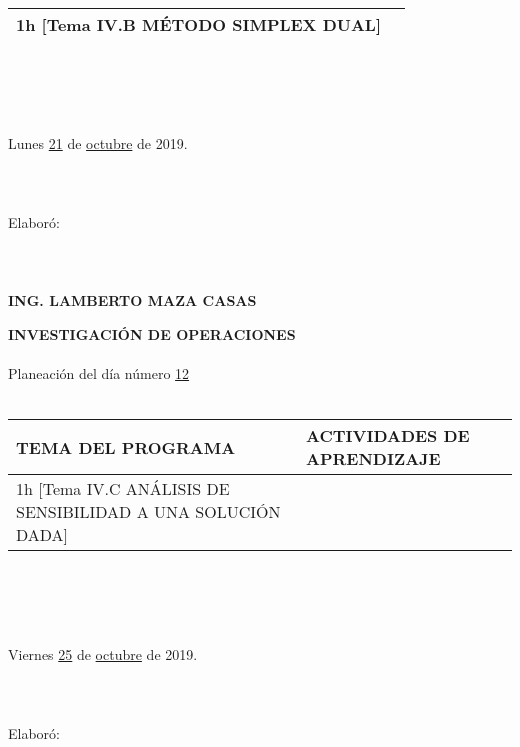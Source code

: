 \documentclass[landscape]{article}
\begin{document}
{\begin{center}
\begin{tabular}{|p{11cm}|p{8cm}|}
	1h	[Tema IV.B M\'ETODO SIMPLEX DUAL]
&\\
\hline
\end{tabular}
\ \\
\ \\
\ \\
\ \\
Lunes \underline{\hspace{0.5cm}21\hspace{0.5cm}} de  \underline{\hspace{0.5cm}octubre\hspace{0.5cm}} de 2019.
\ \\
\ \\
\ \\
\ \\
Elabor\'o:
\ \\
\ \\
\ \\
\ \\
{\bf ING. LAMBERTO MAZA CASAS}
\end{center}
\eject
\begin{center}
{\bf 
INVESTIGACI\'ON DE OPERACIONES
}
\ \\
\ \\
Planeaci\'on del d\'ia n\'umero \underline{\hspace{0.5cm}12\hspace{0.5cm}}
\ \\
\ \\
\begin{tabular}{|p{11cm}|p{8cm}|}\hline
{\bf TEMA DEL PROGRAMA}&{\bf ACTIVIDADES DE APRENDIZAJE}\\\hline
	1h	[Tema IV.C AN\'ALISIS DE SENSIBILIDAD A UNA SOLUCI\'ON DADA]
&\\
\hline
\end{tabular}
\ \\
\ \\
\ \\
\ \\
Viernes \underline{\hspace{0.5cm}25\hspace{0.5cm}} de  \underline{\hspace{0.5cm}octubre\hspace{0.5cm}} de 2019.
\ \\
\ \\
\ \\
\ \\
Elabor\'o:
\ \\
\ \\
\ \\

\end{center}}
\end{document}

